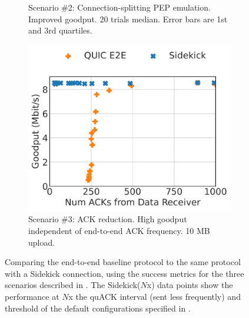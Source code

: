 \begin{figure}
\begin{subfigure}{0.31\textwidth}
\caption{Scenario \#2: Connection-splitting PEP emulation. Improved goodput.
20 trials median. Error bars are 1st and 3rd quartiles.
}
\label{fig:sidekick:main-results:pep-emulation}
\end{subfigure}
\hfill
\begin{subfigure}{0.32\textwidth}
\includegraphics[width=0.99\linewidth]{sidekick/figures/fig4c_ack_reduction.pdf}
\caption{Scenario \#3: ACK reduction.
High goodput independent of end-to-end ACK frequency.
10 MB upload.}
\label{fig:sidekick:main-results:ack-reduction}
\end{subfigure}
\caption{
Comparing the end-to-end baseline protocol to the same protocol with a Sidekick
connection, using the success metrics for the three scenarios described in
. The \textsf{Sidekick($N$x)} data points show
the performance at $N$x the quACK interval (sent less frequently) and
threshold of the default configurations specified in
.
}
\label{fig:sidekick:main-results}
\end{figure}
